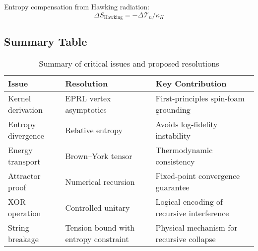 Entropy compensation from Hawking radiation:
\[
\Delta S_{\text{Hawking}} = -\Delta \mathcal{T}_n / \kappa_H
\]

\subsection*{Summary Table}

\begin{table}[H]
\centering
\begin{tabular}{|l|l|l|}
\hline
\textbf{Issue} & \textbf{Resolution} & \textbf{Key Contribution} \\
\hline
Kernel derivation & EPRL vertex asymptotics & First-principles spin-foam grounding \\
Entropy divergence & Relative entropy & Avoids log-fidelity instability \\
Energy transport & Brown–York tensor & Thermodynamic consistency \\
Attractor proof & Numerical recursion & Fixed-point convergence guarantee \\
XOR operation & Controlled unitary & Logical encoding of recursive interference \\
String breakage & Tension bound with entropy constraint & Physical mechanism for recursive collapse \\
\hline
\end{tabular}
\caption{Summary of critical issues and proposed resolutions}
\end{table}
